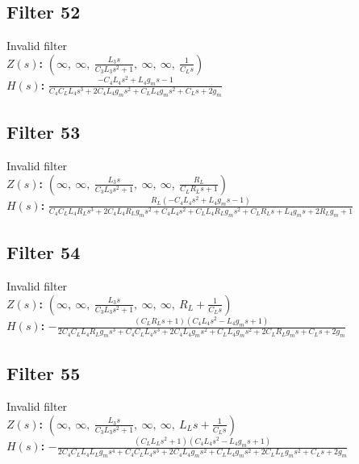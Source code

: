 \documentclass{article}
\begin{document}
\subsection*{Filter 52}
Invalid filter \\ 
\textbf{$Z(s)$:} $\left( \infty, \  \infty, \  \frac{L_{3} s}{C_{3} L_{3} s^{2} + 1}, \  \infty, \  \infty, \  \frac{1}{C_{L} s}\right)$ \\ 
\textbf{$H(s)$:} $\frac{- C_{4} L_{4} s^{2} + L_{4} g_{m} s - 1}{C_{4} C_{L} L_{4} s^{3} + 2 C_{4} L_{4} g_{m} s^{2} + C_{L} L_{4} g_{m} s^{2} + C_{L} s + 2 g_{m}}$ \\ 
\subsection*{Filter 53}
Invalid filter \\ 
\textbf{$Z(s)$:} $\left( \infty, \  \infty, \  \frac{L_{3} s}{C_{3} L_{3} s^{2} + 1}, \  \infty, \  \infty, \  \frac{R_{L}}{C_{L} R_{L} s + 1}\right)$ \\ 
\textbf{$H(s)$:} $\frac{R_{L} \left(- C_{4} L_{4} s^{2} + L_{4} g_{m} s - 1\right)}{C_{4} C_{L} L_{4} R_{L} s^{3} + 2 C_{4} L_{4} R_{L} g_{m} s^{2} + C_{4} L_{4} s^{2} + C_{L} L_{4} R_{L} g_{m} s^{2} + C_{L} R_{L} s + L_{4} g_{m} s + 2 R_{L} g_{m} + 1}$ \\ 
\subsection*{Filter 54}
Invalid filter \\ 
\textbf{$Z(s)$:} $\left( \infty, \  \infty, \  \frac{L_{3} s}{C_{3} L_{3} s^{2} + 1}, \  \infty, \  \infty, \  R_{L} + \frac{1}{C_{L} s}\right)$ \\ 
\textbf{$H(s)$:} $- \frac{\left(C_{L} R_{L} s + 1\right) \left(C_{4} L_{4} s^{2} - L_{4} g_{m} s + 1\right)}{2 C_{4} C_{L} L_{4} R_{L} g_{m} s^{3} + C_{4} C_{L} L_{4} s^{3} + 2 C_{4} L_{4} g_{m} s^{2} + C_{L} L_{4} g_{m} s^{2} + 2 C_{L} R_{L} g_{m} s + C_{L} s + 2 g_{m}}$ \\ 
\subsection*{Filter 55}
Invalid filter \\ 
\textbf{$Z(s)$:} $\left( \infty, \  \infty, \  \frac{L_{3} s}{C_{3} L_{3} s^{2} + 1}, \  \infty, \  \infty, \  L_{L} s + \frac{1}{C_{L} s}\right)$ \\ 
\textbf{$H(s)$:} $- \frac{\left(C_{L} L_{L} s^{2} + 1\right) \left(C_{4} L_{4} s^{2} - L_{4} g_{m} s + 1\right)}{2 C_{4} C_{L} L_{4} L_{L} g_{m} s^{4} + C_{4} C_{L} L_{4} s^{3} + 2 C_{4} L_{4} g_{m} s^{2} + C_{L} L_{4} g_{m} s^{2} + 2 C_{L} L_{L} g_{m} s^{2} + C_{L} s + 2 g_{m}}$ \\ 
\end{document}
